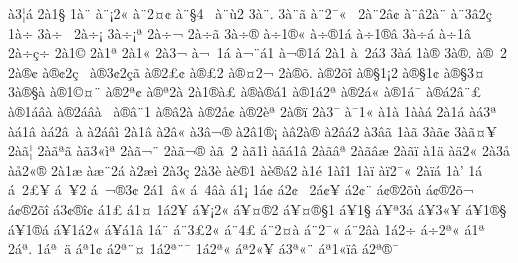 {^^e03^^a6^^e1
2^^e01^^a7
1^^e0^^a8
^^e0^^a8^^a12^^ab
^^e0^^a82^^a4^^a2
^^e0^^a8^^a74^^ad^^a0
^^e0^^a8^^f92
3^^e0^^a8^^ad.
3^^e0^^a8^^ad^^e3
^^e0^^a82^^af^^ab^^a0
2^^e0^^a82^^e2^^a2
^^e0^^a8^^e22^^e0^^a8
^^e0^^a83^^e22^^e7
1^^e0^^f7
3^^e0^^f7^^a0
2^^e0^^f7^^a1
3^^e0^^f7^^a1^^aa
2^^e0^^f7^^ac
2^^e0^^f7^^ad^^e3
3^^e0^^f7^^ae
^^e0^^f71^^ae^^ab
^^e0^^f7^^ae1^^e1
^^e0^^f71^^ae^^e2
3^^e0^^f7^^e1
^^e0^^f71^^e2
2^^e0^^f7^^e7^^f7
2^^e01^^a9
2^^e01^^aa
2^^e01^^ab
2^^e03^^ac
^^e0^^ac^^a01^^e1
^^e0^^ac^^a8^^e11
^^e0^^ac^^ae1^^e1
2^^e01^^ad
^^e0^^ad^^a02^^e13
3^^e0^^ad^^e1
1^^e0^^ae
3^^e0^^ae.
^^e0^^ae^^a02
2^^e0^^ae^^a2^^ad
^^e0^^ae^^a22^^e7^^a0
^^e0^^ae3^^a22^^e7^^e3
^^e0^^ae2^^a3^^a2
^^e0^^ae^^a32^^ad
^^e0^^ae^^a42^^ac
2^^e0^^ae^^f5.
^^e0^^ae2^^f5^^ee
^^e0^^ae^^a71^^a12
^^e0^^ae^^a71^^a2
^^e0^^ae^^a73^^a4
3^^e0^^ae^^a7^^e0
^^e0^^ae1^^a9^^a4^^a8
^^e0^^ae2^^aa^^a2
^^e0^^ae^^aa2^^e0
2^^e01^^ae^^e0^^a3
^^e0^^ae^^e0^^ae^^e11
^^e0^^ae1^^e12^^aa
^^e0^^ae2^^e1^^ab
^^e0^^ae1^^e1^^af
^^e0^^ae^^e12^^e2^^a8^^a3
^^e0^^ae1^^e1^^e2^^e0
^^e0^^ae2^^e1^^e2^^e0^^a0
^^e0^^ae^^e2^^a81
^^e0^^ae^^e22^^e0
^^e0^^ae2^^e5^^a2
^^e0^^ae2^^e8^^aa
2^^e0^^ae^^ef
2^^e03^^af
^^e0^^af1^^ab
^^e01^^e0
1^^e0^^e0^^e1
2^^e01^^e1
^^e0^^e13^^aa
^^e0^^e11^^e2
^^e0^^e12^^e2^^a0^^e0
^^e02^^e1^^e2^^ec
2^^e01^^e2
^^e02^^e2^^ab
^^e03^^e2^^ac^^ae
^^e02^^e21^^ae^^a1
^^e0^^e22^^e0^^ae
^^e02^^e2^^e12
^^e03^^e2^^e3
1^^e0^^e3
3^^e0^^e3^^a2
3^^e0^^e3^^a4^^a5
2^^e0^^e3^^a6
2^^e0^^e3^^aa^^e3
^^e0^^e33^^ab^^ec^^aa
2^^e0^^e3^^ac^^a8
2^^e0^^e3^^ac^^ae
^^e0^^e3^^ad^^a02
^^e0^^e31^^ad^^ec
^^e0^^e3^^e11^^e2
2^^e0^^e3^^e2^^aa
2^^e0^^e3^^e2^^e6
2^^e0^^e3^^ef
^^e01^^e4
^^e0^^e42^^ab
2^^e03^^e5
^^e0^^e52^^ab^^ae
2^^e01^^e6
^^e0^^e6^^a82^^e1
^^e02^^e6^^ec
2^^e03^^e7
2^^e03^^e8
^^e0^^e8^^ae1
^^e0^^e8^^ae^^e12
^^e01^^e9
1^^e0^^ee1
1^^e0^^ef
^^e0^^ef2^^af^^ab
2^^e0^^ef^^e1
1^^e0'
1^^e1^^a0
^^e1^^a02^^a3^^a5
^^e1^^a0^^a52
^^e1^^a0^^ac^^ae3^^a2
2^^e11^^a0^^e2^^ab
^^e1^^a04^^e2^^e0
^^e11^^a1
1^^e1^^a2
^^e12^^a2^^a0
2^^e1^^a2^^a5
^^e12^^a2^^a8
^^e1^^a2^^ae2^^f5^^f9
^^e1^^a2^^ae2^^f5^^ac
^^e1^^a2^^ae2^^f5^^ee
^^e13^^a2^^ae^^ee^^a2
^^e11^^a3
^^e11^^a4
1^^e12^^a5
^^e1^^a5^^a12^^ab
^^e1^^a5^^a4^^ae2
^^e1^^a5^^a4^^ae^^a71
^^e1^^a51^^a7
^^e1^^a5^^aa3^^e1
^^e1^^a53^^ab^^a5
^^e1^^a51^^ae^^a7
^^e1^^a51^^ae^^e1
^^e1^^a51^^e12^^ab
^^e1^^a5^^e11^^e2
1^^e1^^a8
^^e1^^a83^^a32^^ab
^^e1^^a84^^a3^^ad
^^e1^^a82^^a4^^e0
^^e1^^a82^^af^^ab
^^e1^^a82^^e2^^e0
1^^e12^^f7
^^e1^^f72^^aa^^ab
^^e11^^aa
2^^e1^^aa.
1^^e1^^aa^^a0^^e4
^^e1^^aa1^^a2
^^e12^^aa^^a8^^a4
1^^e12^^aa^^a8^^af
1^^e12^^aa^^ab
^^e1^^aa2^^ab^^a5
^^e13^^aa^^ab^^a8
^^e1^^aa1^^ab^^ef^^e2
^^e12^^aa^^ae^^af
}
